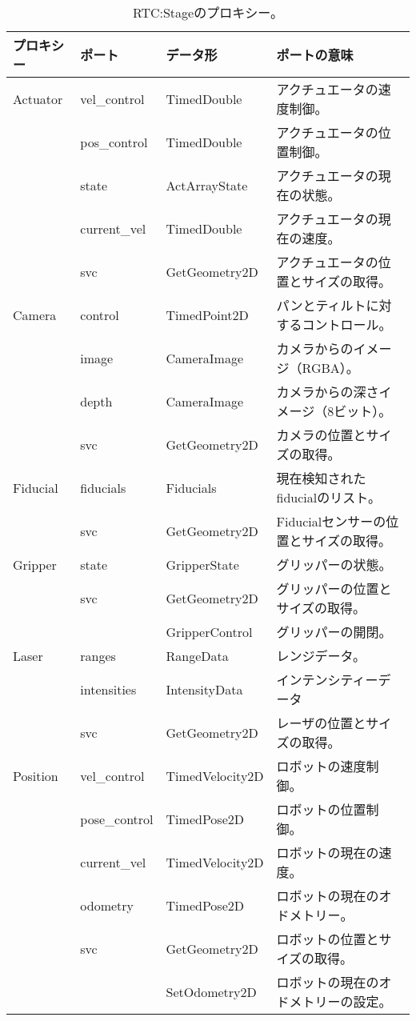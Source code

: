 \documentclass[a4paper,10pt]{article}
\newenvironment{Japanese}{%
  \CJKfamily{min}%
  \CJKtilde
  \CJKnospace}{}
\begin{document}
\begin{CJK}{UTF8}{}
\begin{Japanese}
\begin{table}[t]
  \centering
  \begin{tabularx}{\columnwidth}{lllX}
    \toprule
    プロキシー & ポート & データ形 & ポートの意味 \\
    \midrule
    Actuator & vel\_control & TimedDouble & アクチュエータの速度制御。 \\
     & pos\_control & TimedDouble & アクチュエータの位置制御。 \\
     & state & ActArrayState & アクチュエータの現在の状態。 \\
     & current\_vel & TimedDouble & アクチュエータの現在の速度。 \\
     & svc & GetGeometry2D & アクチュエータの位置とサイズの取得。 \\
    Camera & control & TimedPoint2D & パンとティルトに対するコントロール。 \\
     & image & CameraImage & カメラからのイメージ（RGBA）。 \\
     & depth & CameraImage & カメラからの深さイメージ（8ビット）。 \\
     & svc & GetGeometry2D & カメラの位置とサイズの取得。 \\
    Fiducial & fiducials & Fiducials & 現在検知されたfiducialのリスト。 \\
     & svc & GetGeometry2D & Fiducialセンサーの位置とサイズの取得。 \\
    Gripper & state & GripperState & グリッパーの状態。 \\
     & svc & GetGeometry2D & グリッパーの位置とサイズの取得。 \\
     & & GripperControl & グリッパーの開閉。 \\
    Laser & ranges & RangeData & レンジデータ。 \\
     & intensities & IntensityData & インテンシティーデータ \\
     & svc & GetGeometry2D & レーザの位置とサイズの取得。 \\
    Position & vel\_control & TimedVelocity2D & ロボットの速度制御。 \\
     & pose\_control & TimedPose2D & ロボットの位置制御。 \\
     & current\_vel & TimedVelocity2D & ロボットの現在の速度。 \\
     & odometry & TimedPose2D & ロボットの現在のオドメトリー。 \\
     & svc & GetGeometry2D & ロボットの位置とサイズの取得。 \\
     & & SetOdometry2D & ロボットの現在のオドメトリーの設定。 \\
    \bottomrule
  \end{tabularx}
  \caption{RTC:Stageのプロキシー。}
  \label{tab:proxies}
\end{table}


\end{Japanese}
\end{CJK}
\end{document}
